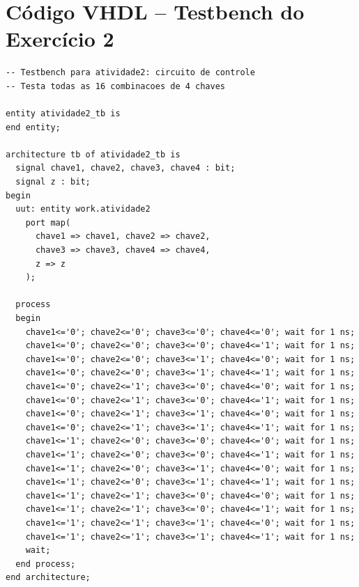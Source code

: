\documentclass[12pt,a4paper, brazil]{article}
\begin{document}
\newpage
\section{Código VHDL -- Testbench do Exercício 2}
\label{ap:testbench-ex2}

\begin{lstlisting}[style=vhdl, caption={Arquivo atividade2\_tb.vhd -- testbench com todas as 16 combinações.}]
-- Testbench para atividade2: circuito de controle
-- Testa todas as 16 combinacoes de 4 chaves

entity atividade2_tb is
end entity;

architecture tb of atividade2_tb is
  signal chave1, chave2, chave3, chave4 : bit;
  signal z : bit;
begin
  uut: entity work.atividade2
    port map(
      chave1 => chave1, chave2 => chave2,
      chave3 => chave3, chave4 => chave4,
      z => z
    );

  process
  begin
    chave1<='0'; chave2<='0'; chave3<='0'; chave4<='0'; wait for 1 ns;
    chave1<='0'; chave2<='0'; chave3<='0'; chave4<='1'; wait for 1 ns;
    chave1<='0'; chave2<='0'; chave3<='1'; chave4<='0'; wait for 1 ns;
    chave1<='0'; chave2<='0'; chave3<='1'; chave4<='1'; wait for 1 ns;
    chave1<='0'; chave2<='1'; chave3<='0'; chave4<='0'; wait for 1 ns;
    chave1<='0'; chave2<='1'; chave3<='0'; chave4<='1'; wait for 1 ns;
    chave1<='0'; chave2<='1'; chave3<='1'; chave4<='0'; wait for 1 ns;
    chave1<='0'; chave2<='1'; chave3<='1'; chave4<='1'; wait for 1 ns;
    chave1<='1'; chave2<='0'; chave3<='0'; chave4<='0'; wait for 1 ns;
    chave1<='1'; chave2<='0'; chave3<='0'; chave4<='1'; wait for 1 ns;
    chave1<='1'; chave2<='0'; chave3<='1'; chave4<='0'; wait for 1 ns;
    chave1<='1'; chave2<='0'; chave3<='1'; chave4<='1'; wait for 1 ns;
    chave1<='1'; chave2<='1'; chave3<='0'; chave4<='0'; wait for 1 ns;
    chave1<='1'; chave2<='1'; chave3<='0'; chave4<='1'; wait for 1 ns;
    chave1<='1'; chave2<='1'; chave3<='1'; chave4<='0'; wait for 1 ns;
    chave1<='1'; chave2<='1'; chave3<='1'; chave4<='1'; wait for 1 ns;
    wait;
  end process;
end architecture;
\end{lstlisting}
\end{document}
